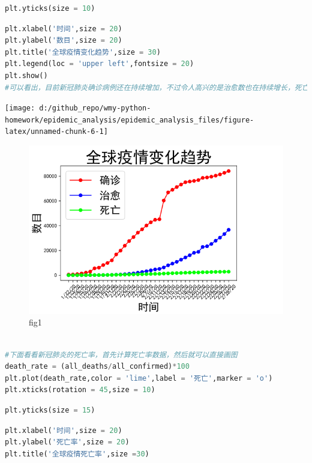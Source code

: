\documentclass[UTF8,a4paper,12pt]{ctexart}  %
\begin{document}
\begin{lstlisting}[language=Python]
plt.yticks(size = 10)
\end{lstlisting}

\begin{lstlisting}[language=Python]
plt.xlabel('时间',size = 20)
plt.ylabel('数目',size = 20)
plt.title('全球疫情变化趋势',size = 30)
plt.legend(loc = 'upper left',fontsize = 20)
plt.show()
#可以看出，目前新冠肺炎确诊病例还在持续增加，不过令人高兴的是治愈数也在持续增长，死亡数很少
\end{lstlisting}

\begin{center}\texttt{[image: d:/github\_repo/wmy-python-homework/epidemic\_analysis/epidemic\_analysis\_files/figure-latex/unnamed-chunk-6-1]} \end{center}

\begin{figure}
\centering
\includegraphics{./fig1.png}
\caption{fig1}
\end{figure}

\begin{lstlisting}[language=Python]

#下面看看新冠肺炎的死亡率，首先计算死亡率数据，然后就可以直接画图
death_rate = (all_deaths/all_confirmed)*100
plt.plot(death_rate,color = 'lime',label = '死亡',marker = 'o')
plt.xticks(rotation = 45,size = 10)
\end{lstlisting}

\begin{lstlisting}[language=Python]
plt.yticks(size = 15)
\end{lstlisting}

\begin{lstlisting}[language=Python]
plt.xlabel('时间',size = 20)
plt.ylabel('死亡率',size = 20)
plt.title('全球疫情死亡率',size =30)
\end{lstlisting}
\end{document}

